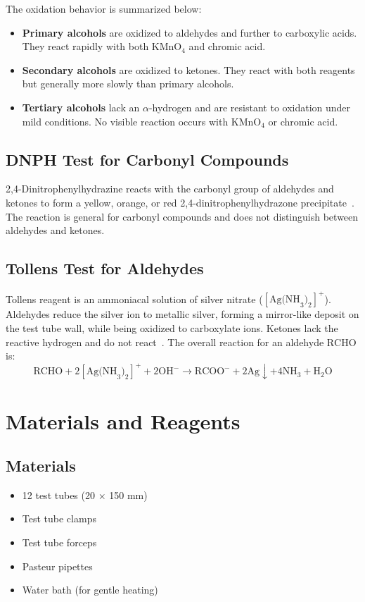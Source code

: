 \documentclass[12pt, a4paper]{article}
\begin{document}
The oxidation behavior is summarized below:
\begin{itemize}
    \item \textbf{Primary alcohols} are oxidized to aldehydes and further to carboxylic acids. They react rapidly with both $\text{KMnO}_4$ and chromic acid.
    \item \textbf{Secondary alcohols} are oxidized to ketones. They react with both reagents but generally more slowly than primary alcohols.
    \item \textbf{Tertiary alcohols} lack an $\alpha$-hydrogen and are resistant to oxidation under mild conditions. No visible reaction occurs with $\text{KMnO}_4$ or chromic acid.
\end{itemize}

\subsection{DNPH Test for Carbonyl Compounds}
2,4-Dinitrophenylhydrazine reacts with the carbonyl group of aldehydes and ketones to form a yellow, orange, or red 2,4-dinitrophenylhydrazone precipitate~\cite{pavia2013}. The reaction is general for carbonyl compounds and does not distinguish between aldehydes and ketones.

\subsection{Tollens Test for Aldehydes}
Tollens reagent is an ammoniacal solution of silver nitrate ($[\text{Ag(NH}_3)_2]^+$). Aldehydes reduce the silver ion to metallic silver, forming a mirror-like deposit on the test tube wall, while being oxidized to carboxylate ions. Ketones lack the reactive hydrogen and do not react~\cite{vogel1996}. The overall reaction for an aldehyde $\text{RCHO}$ is:
\begin{equation}
\text{RCHO} + 2[\text{Ag(NH}_3)_2]^+ + 2\text{OH}^- \longrightarrow \text{RCOO}^- + 2\text{Ag}\downarrow + 4\text{NH}_3 + \text{H}_2\text{O}
\end{equation}

\section{Materials and Reagents}

\subsection{Materials}
\begin{itemize}
    \item 12 test tubes (20 $\times$ 150 mm)
    \item Test tube clamps
    \item Test tube forceps
    \item Pasteur pipettes
    \item Water bath (for gentle heating)
\end{itemize}
\end{document}
